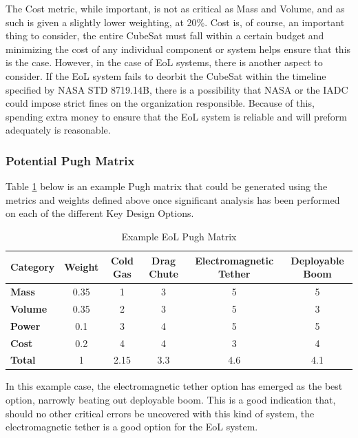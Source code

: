 The Cost metric, while important, is not as critical as Mass and Volume, and as such is given a slightly lower weighting, at 20\%. Cost is, of course, an important thing to consider, the entire CubeSat must fall within a certain budget and minimizing the cost of any individual component or system helps ensure that this is the case. However, in the case of EoL systems, there is another aspect to consider. If the EoL system fails to deorbit the CubeSat within the timeline specified by NASA STD 8719.14B, there is a possibility that NASA or the IADC could impose strict fines on the organization responsible. Because of this, spending extra money to ensure that the EoL system is reliable and will preform adequately is reasonable. 
\subsubsection{Potential Pugh Matrix}

Table \ref{tbl:EoL_Pugh} below is an example Pugh matrix that could be generated using the metrics and weights defined above once significant analysis has been performed on each of the different Key Design Options. 
\begin{table}[H]
\centering
\begin{tabular}{|l|c|c|c|c|c|} 
\hline
    \textbf{Category} & \textbf{Weight} & \textbf{Cold Gas} & \textbf{Drag Chute} & \textbf{Electromagnetic Tether} & \textbf{Deployable Boom}
    \\
\hline
    \textbf{Mass} & 0.35 & 1 & 3 & 5 & 5
    \\
\hline
    \textbf{Volume} & 0.35 & 2 & 3 & 5 & 3 
    \\
\hline
    \textbf{Power} & 0.1 & 3 & 4 & 5 & 5 
    \\
\hline
    \textbf{Cost} & 0.2 & 4 & 4 & 3 & 4 
    \\
\hline
    \textbf{Total} & 1 & 2.15 & 3.3 & 4.6 & 4.1 
    \\
\hline
\end{tabular}
\caption{Example EoL Pugh Matrix }
\label{tbl:EoL_Pugh}
\end{table}

In this example case, the electromagnetic tether option has emerged as the best option, narrowly beating out deployable boom. This is a good indication that, should no other critical errors be uncovered with this kind of system, the electromagnetic tether is a good option for the EoL system.
